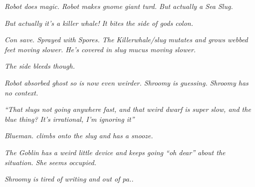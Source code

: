 \textit{Robot does magic. Robot makes gnome giant turd. But actually a Sea Slug.}\medskip

\textit{But actually it’s a killer whale! It bites the side of gods colon.}\medskip

\textit{Con save. Sprayed with Spores. The Killerwhale/slug mutates and grows webbed feet moving slower. He’s covered in slug mucus moving slower.}\medskip

\textit{The side bleeds though.}\medskip

\textit{Robot absorbed ghost so is now even weirder. Shroomy is guessing. Shroomy has no context.}\medskip

\textit{“That slugs not going anywhere fast, and that weird dwarf is super slow, and the blue thing? It’s irrational, I’m ignoring it”}\medskip

\textit{Blueman. climbs onto the slug and has a snooze.}\medskip

\textit{The Goblin has a weird little device and keeps going “oh dear” about the situation. She seems occupied.}\medskip

\textit{Shroomy is tired of writing and out of pa..}\medskip

\vspace*{5mm}

